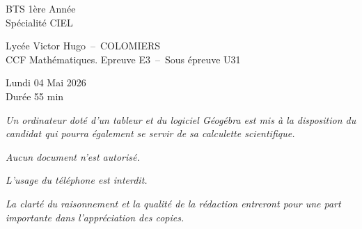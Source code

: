 \thispagestyle{empty}
    \begin{minipage}{0.22\linewidth}
    \begin{tcolorbox}[colback=white, title=, width=1\linewidth]	
        BTS 1ère Année \\
        Spécialité CIEL 
    \end{tcolorbox}
\end{minipage}\hfill
\begin{minipage}{0.55\linewidth}
    \begin{tcolorbox}[colback=white, title=, width=1\linewidth]	
        \begin{center}
            Lycée Victor Hugo~--~COLOMIERS \\
            CCF Mathématiques. Epreuve E3~--~Sous épreuve U31 
        \end{center}
        
    \end{tcolorbox}
\end{minipage}\hfill
\begin{minipage}{0.23\linewidth}
    \begin{tcolorbox}[colback=white, title=, width=1\linewidth]	
        \begin{center}
            Lundi 04 Mai 2026 \\
    Durée 55 min
        \end{center}
        
    \end{tcolorbox}
\end{minipage}\hfill

\vspace{2cm}

\NomPrenom{}

\vspace{2cm}

\begin{center}
    
\emph{Un ordinateur doté d'un tableur et du logiciel Géogébra est mis à la disposition du candidat qui pourra également se servir de sa calculette scientifique.}

\bigskip

\emph{Aucun document n'est autorisé.}

\bigskip

\emph{L'usage du téléphone est interdit.}

\bigskip

\emph{La clarté du raisonnement et la qualité de la rédaction entreront pour une part importante dans l'appréciation des copies.}

\end{center}

